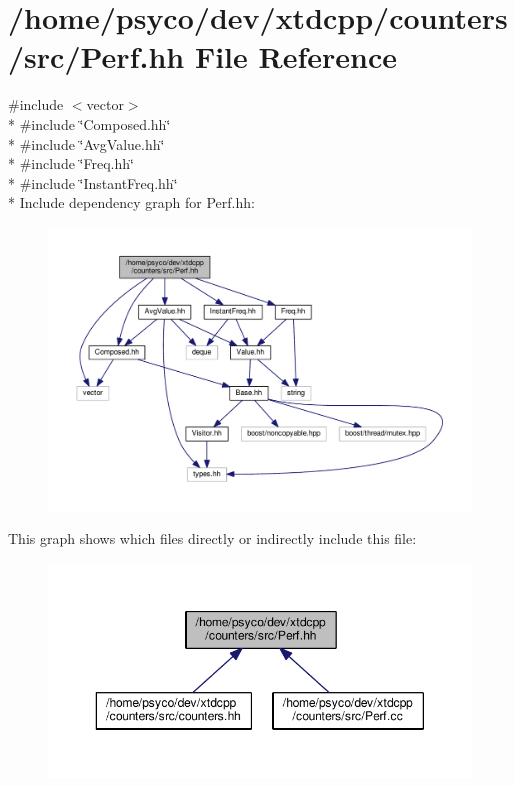 \hypertarget{Perf_8hh}{}\section{/home/psyco/dev/xtdcpp/counters/src/\+Perf.hh File Reference}
\label{Perf_8hh}
{\ttfamily \#include $<$vector$>$}\\*
{\ttfamily \#include \char`\"{}Composed.\+hh\char`\"{}}\\*
{\ttfamily \#include \char`\"{}Avg\+Value.\+hh\char`\"{}}\\*
{\ttfamily \#include \char`\"{}Freq.\+hh\char`\"{}}\\*
{\ttfamily \#include \char`\"{}Instant\+Freq.\+hh\char`\"{}}\\*
Include dependency graph for Perf.\+hh\+:
\nopagebreak
\begin{figure}[H]
\begin{center}
\leavevmode
\includegraphics[width=350pt]{Perf_8hh__incl}
\end{center}
\end{figure}
This graph shows which files directly or indirectly include this file\+:
\nopagebreak
\begin{figure}[H]
\begin{center}
\leavevmode
\includegraphics[width=350pt]{Perf_8hh__dep__incl}
\end{center}
\end{figure}

